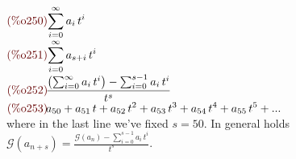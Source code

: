 \begin{math}\displaystyle
\parbox{8ex}{\color{labelcolor}(\%o250) }
\sum_{i=0}^{\infty }{a}_{i}\,{t}^{i}
\end{math}\\
\begin{math}\displaystyle
\parbox{8ex}{\color{labelcolor}(\%o251) }
\sum_{i=0}^{\infty }{a}_{s+i}\,{t}^{i}
\end{math}\\
\begin{math}\displaystyle
\parbox{8ex}{\color{labelcolor}(\%o252) }
\frac{\left( \sum_{i=0}^{\infty }{a}_{i}\,{t}^{i}\right) -\sum_{i=0}^{s-1}{a}_{i}\,{t}^{i}}{{t}^{s}}
\end{math}\\
\begin{math}\displaystyle
\parbox{8ex}{\color{labelcolor}(\%o253) }
{a}_{50}+{a}_{51}\,t+{a}_{52}\,{t}^{2}+{a}_{53}\,{t}^{3}+{a}_{54}\,{t}^{4}+{a}_{55}\,{t}^{5}+...
\end{math}\\
where in the last line we've fixed $s = 50$. In general holds
$\mathcal{G}(a_{n+s}) = \frac{\mathcal{G} (a_n)
  -\sum_{i=0}^{s-1}{a}_{i}\,{t}^{i}}{{t}^{s}}$.











